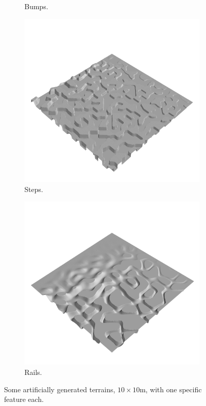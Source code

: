 \documentclass[../document.tex]{subfiles}
\begin{document}
\begin{figure} [htbp]
\begin{subfigure}[b]{0.24\textwidth}
        \caption{Bumps.}
 \end{subfigure}  
    \begin{subfigure}[b]{0.24\textwidth}
        \includegraphics[width=\linewidth]{../img/hm3d/steps1.png}
        \caption{Steps.}
 \end{subfigure}  
    \begin{subfigure}[b]{0.24\textwidth}
        \includegraphics[width=\linewidth]{../img/hm3d/rails3.png}
        \caption{Rails.}
    \end{subfigure}  
\caption{Some artificially generated terrains, $10\times 10$m, with one specific feature each. }   
\end{figure}
\end{document}
